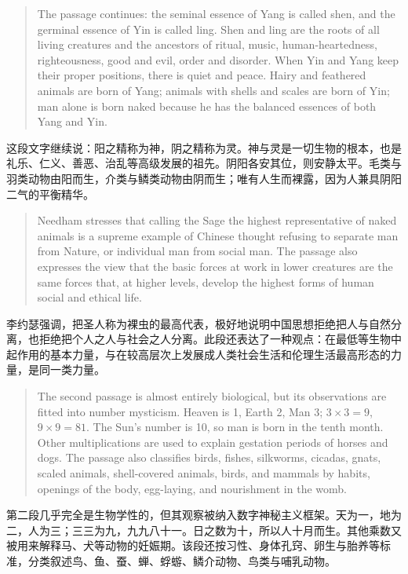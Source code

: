 \documentclass[UTF8,zihao=-4]{ctexart}
\newenvironment{enblock}
  {\par\smallskip\noindent{\scriptsize\bfseries English}\par\begin{quote}\small}
  {\end{quote}}
\newenvironment{zhblock}
  {\par\noindent{\scriptsize\bfseries 中文}\par}
  {\par\medskip}
\begin{document}
\begin{enblock}
The passage continues: the seminal essence of Yang is called shen, and the germinal essence of Yin is called ling. Shen and ling are the roots of all living creatures and the ancestors of ritual, music, human-heartedness, righteousness, good and evil, order and disorder. When Yin and Yang keep their proper positions, there is quiet and peace. Hairy and feathered animals are born of Yang; animals with shells and scales are born of Yin; man alone is born naked because he has the balanced essences of both Yang and Yin.
\end{enblock}
\begin{zhblock}
这段文字继续说：阳之精称为神，阴之精称为灵。神与灵是一切生物的根本，也是礼乐、仁义、善恶、治乱等高级发展的祖先。阴阳各安其位，则安静太平。毛类与羽类动物由阳而生，介类与鳞类动物由阴而生；唯有人生而裸露，因为人兼具阴阳二气的平衡精华。
\end{zhblock}

\begin{enblock}
Needham stresses that calling the Sage the highest representative of naked animals is a supreme example of Chinese thought refusing to separate man from Nature, or individual man from social man. The passage also expresses the view that the basic forces at work in lower creatures are the same forces that, at higher levels, develop the highest forms of human social and ethical life.
\end{enblock}
\begin{zhblock}
李约瑟强调，把圣人称为裸虫的最高代表，极好地说明中国思想拒绝把人与自然分离，也拒绝把个人之人与社会之人分离。此段还表达了一种观点：在最低等生物中起作用的基本力量，与在较高层次上发展成人类社会生活和伦理生活最高形态的力量，是同一类力量。
\end{zhblock}

\begin{enblock}
The second passage is almost entirely biological, but its observations are fitted into number mysticism. Heaven is 1, Earth 2, Man 3; \(3 \times 3 = 9\), \(9 \times 9 = 81\). The Sun's number is 10, so man is born in the tenth month. Other multiplications are used to explain gestation periods of horses and dogs. The passage also classifies birds, fishes, silkworms, cicadas, gnats, scaled animals, shell-covered animals, birds, and mammals by habits, openings of the body, egg-laying, and nourishment in the womb.
\end{enblock}
\begin{zhblock}
第二段几乎完全是生物学性的，但其观察被纳入数字神秘主义框架。天为一，地为二，人为三；三三为九，九九八十一。日之数为十，所以人十月而生。其他乘数又被用来解释马、犬等动物的妊娠期。该段还按习性、身体孔窍、卵生与胎养等标准，分类叙述鸟、鱼、蚕、蝉、蜉蝣、鳞介动物、鸟类与哺乳动物。
\end{zhblock}
\end{document}
